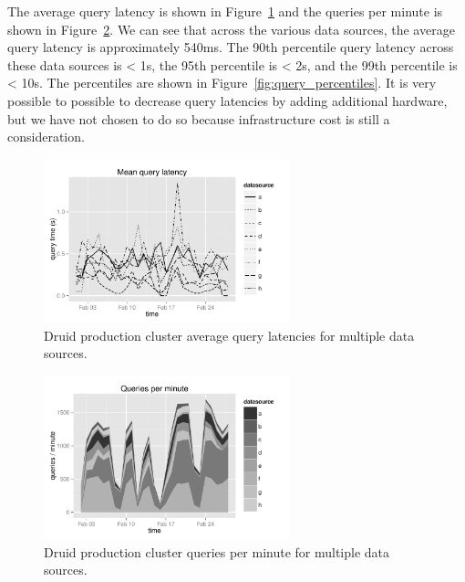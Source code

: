 \documentclass{acm_proc_article-sp}
\begin{document}
The average query latency is shown in Figure~\ref{fig:avg_query_latency} and
the queries per minute is shown in Figure~\ref{fig:queries_per_min}. We can see
that across the various data sources, the average query latency is approximately
540ms. The 90th percentile query latency across these data sources is < 1s, the
95th percentile is < 2s, and the 99th percentile is < 10s. The percentiles are
shown in Figure~\ref{fig:query_percentiles}. It is very possible to possible to
decrease query latencies by adding additional hardware, but we have not chosen
to do so because infrastructure cost is still a consideration.

\begin{figure}
\centering 
\includegraphics[width = 2.8in]{avg_query_latency}
\caption{Druid production cluster average query latencies for multiple data sources.} 
\label{fig:avg_query_latency}
\end{figure}

\begin{figure}
\centering 
\includegraphics[width = 2.8in]{queries_per_min}
\caption{Druid production cluster queries per minute for multiple data sources.} 
\label{fig:queries_per_min}
\end{figure}
\end{document}
